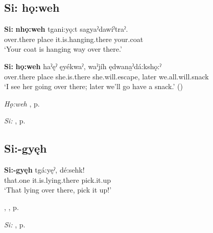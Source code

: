 \subsection*{\textbf{Si: hǫ:weh} } \label{p:[si: hǫ:weh]}

\ea
\label{ex:spart57}
\gll \textbf{Si:} \textbf{nhǫ:weh} tgani:yǫ:t sagyaˀdawíˀtraˀ.\\
over.there place it.is.hanging.there your.coat\\
\glt ‘Your coat is hanging way over there.’
\z

\ea
\label{ex:spart58}
\gll \textbf{Si:} \textbf{hǫ:weh} haˀęˀ ęyékwaˀ, waˀjíh ędwana̱ˀdá:kshǫ:ˀ\\
over.there place she.is.there she.will.escape, later we.all.will.snack\\
\glt ‘I see her going over there; later we’ll go have a snack.’ (\cite{henry_de_2005})
\z

\begin{CayugaRelated}
\item \textit{Hǫ:weh} , p. \pageref{p:[hǫ:weh]}\\
\item \textit{Si:} , p. \pageref{p:[si:]}
\end{CayugaRelated}


\subsection*{\textbf{Si:-gyęh} } \label{p:[si:-gyęh]}

\ea
\label{ex:spart59}
\gll \textbf{Si:-gyęh} tgá:yęˀ, dé:sehk!\\
that.one it.is.lying.there pick.it.up\\
\glt ‘That lying over there, pick it up!’
\z

\begin{CayugaRelated}
\item {} , , p. \pageref{p:[-gyęh]}\\
\item \textit{Si:} , p. \pageref{p:[si:]}
\end{CayugaRelated}


